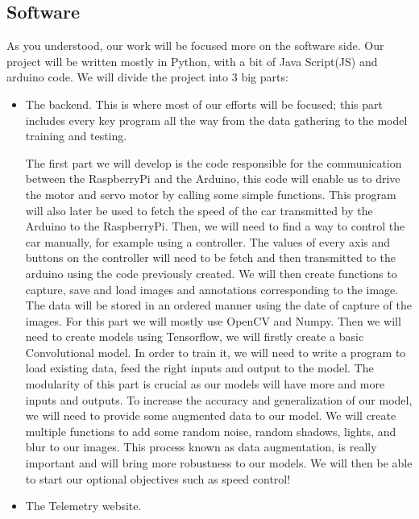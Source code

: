 \documentclass[12pt]{article}
\begin{document}
\subsection{Software}
As you understood, our work will be focused more on the software side.
Our project will be written mostly in Python, with a bit of Java Script(JS) and arduino code.
We will divide the project into 3 big parts:
\begin{itemize}
\item The backend. This is where most of our efforts will be focused; this part includes every key program all the way from the data gathering to the model training and testing.

The first part we will develop is the code responsible for the communication between the RaspberryPi and the Arduino, this code will enable us to drive the motor and servo motor by calling some simple functions. This program will also later be used to fetch the speed of the car transmitted by the Arduino to the RaspberryPi.
Then, we will need to find a way to control the car manually, for example using a controller. The values of every axis and buttons on the controller will need to be fetch and then transmitted to the arduino using the code previously created.
We will then create functions to capture, save and load images and annotations corresponding to the image. The data will be stored in an ordered manner using the date of capture of the images. For this part we will mostly use OpenCV and Numpy.
Then we will need to create models using Tensorflow, we will firstly create a basic Convolutional model. In order to train it, we will need to write a program to load existing data, feed the right inputs and output to the model. The modularity of this part is crucial as our models will have more and more inputs and outputs.
To increase the accuracy and generalization of our model, we will need to provide some augmented data to our model. We will create multiple functions to add some random noise, random shadows, lights, and blur to our images. This process known as data augmentation, is really important and will bring more robustness to our models.
We will then be able to start our optional objectives such as speed control!

\item The Telemetry website.


\end{itemize}
\end{document}
